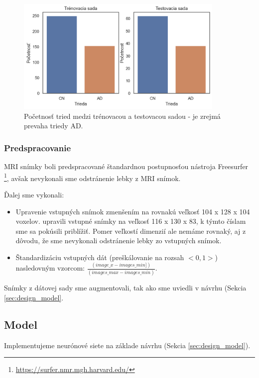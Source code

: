 \begin{figure}[H]
    \centering
    \includegraphics[width=10cm]{assets/images/dataset_classes.png}
    \caption{Početnosť tried medzi trénovacou a testovacou sadou - je zrejmá prevaha triedy AD.}
    \label{fig:dataset_classes}
\end{figure}

\subsubsection{Predspracovanie}

MRI snímky boli predspracované štandardnou postupnosťou nástroja Freesurfer \footnote{\url{https://surfer.nmr.mgh.harvard.edu/}}, avšak nevykonali sme odstránenie lebky z MRI snímok.

Ďalej sme vykonali:

\begin{itemize}
    \item Upravenie vstupných snímok zmenšením na rovnakú veľkosť 104 x 128 x 104 voxelov. \citeauthor*{esmaeilzadeh2018end} upravili vstupné snímky na veľkosť 116 x 130 x 83, k týmto číslam sme sa pokúsili priblížiť. Pomer veľkostí dimenzií ale nemáme rovnaký, aj z dôvodu, že sme nevykonali odstránenie lebky zo vstupných snímok.
    \item Štandardizáciu vstupných dát (preškálovanie na rozsah $<0, 1>$) nasledovným vzorcom: $\frac{(image\_x - images\_min])}{(images\_max - images\_min)}$.
\end{itemize}

Snímky z dátovej sady sme augmentovali, tak ako sme uviedli v návrhu (Sekcia \ref{sec:design_model}.

\subsection{Model}

Implementujeme neurónové siete na základe návrhu (Sekcia \ref{sec:design_model}).

